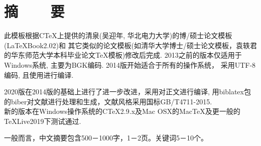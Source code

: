 \documentclass[12pt,a4paper,zihao=-4,UTF8]{book}
\renewcommand{\baselinestretch}{1.5} %
\begin{document}
\captionsetup[table]{labelsep=quad}
\captionsetup[figure]{labelsep=quad}





\frontmatter         \sloppy            





\restoregeometry
{}

\begin{spacing}{1}
  
\end{spacing}

\renewcommand{\baselinestretch}{1.8}

\chapter*{摘~~~~要}

此模板根据CTeX上提供的清泉(吴迎年,
华北电力大学)的博/硕士论文模板(LaTeXBook2.02)和
其它类似的论文模板(如清华大学博士/硕士论文模板，袁轶君的华东师范大学本科毕业论文\TeX{}模板)修改后完成.
2013之前的版本仅适用于Windows系统, 主要为BGK编码.
2014版开始适合于所有的操作系统， 采用UTF-8编码,
且使用\XeLaTeX{}进行编译.

2020版在2014版的基础上进行了进一步改进，采用\XeLaTeX{}对正文进行编译,
用biblatex包的biber对文献进行处理和生成，文献风格采用国标GB/T4711-2015.\\
新的版本在Windows操作系统的CTeX2.9.x及Mac
OSX的MacTeX及更一般的TeXLive2019下测试通过.

一般而言，中文摘要包含500－1000字，1－2页。关键词5－10个。
\end{document}
